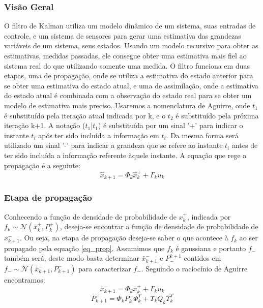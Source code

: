 \subsubsection{Visão Geral}
O filtro de Kalman utiliza um modelo dinâmico de um sistema, suas entradas de controle, e um sistema de sensores para gerar uma estimativa das grandezas variáveis de um sistema, seus estados. Usando um modelo recursivo para obter as estimativas, medidas passadas, ele consegue obter uma estimativa mais fiel ao sistema real do que utilizando somente uma medida. O filtro funciona em duas etapas, uma de propagação, onde se utiliza a estimativa do estado anterior para se obter uma estimativa do estado atual, e uma de assimilação, onde a estimativa do estado atual é combinada com a observação do estado real para se obter um modelo de estimativa mais preciso.
\newline
Usaremos a nomenclatura de Aguirre, onde $t_1$ é substituído pela iteração atual indicada por k, e o $t_2$ é substituído pela próxima iteração k+1. A notação ($t_1$|$t_1$) é substituída por um sinal '+' para indicar o instante $t_i$ após ter sido incluída a informação em $t_i$. Da mesma forma será utilizado um sinal '-' para indicar a grandeza que se refere ao instante $t_i$ antes de ter sido incluída a informação referente àquele instante. A equação que rege a propagação é a seguinte:
\begin{equation} \label{eq_prop}
\hat{x}^{-}_{k+1}=\Phi_k \hat{x}^+_k+\Gamma_ku_k
\end{equation}

\subsubsection{Etapa de propagação}
Conhecendo a função de densidade de probabilidade de $x_k^+$, indicada por $f_k\sim \mathcal{N}(\bar{x}^+_k, P^+_k)$, deseja-se encontrar a função de densidade de probabilidade de $x^-_{k+1}$. Ou seja, na etapa de propagação deseja-se saber o que acontece à $f_k$ ao ser propagado pela equação \ref{eq_prop}. Assumimos que $f_k$ é gaussiana e portanto $f_-$ também será, deste modo basta determinar $\bar{x}^-_{k+1}$ e $P_-^{k+1}$ contidos em $f_- \sim \mathcal{N}(\bar{x}^-_{k+1},P^-_{k+1})$ para caracterizar $f_-$.
\newline
Seguindo o raciocínio de Aguirre encontramos:
\begin{equation}
\bar{x}^-_{k+1}=\Phi_k\bar{x}^+_k+\Gamma_ku_k
\end{equation}
\begin{equation}
P^-_{k+1}=\Phi_kP^+_k\Phi^T_k+\Upsilon_kQ_k\Upsilon^T_k
\end{equation}

